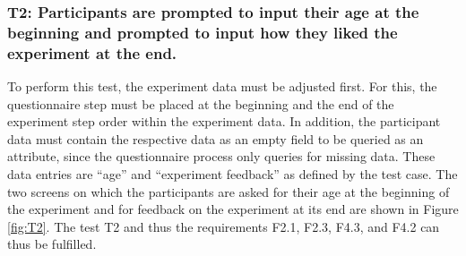 \newpage



\subsubsection*{T2: Participants are prompted to input their age at the beginning and prompted to input how they liked the experiment at the end.}

To perform this test, the experiment data must be adjusted first. For this, the questionnaire step must be placed at the beginning and the end of the experiment step order within the experiment data. In addition, the participant data must contain the respective data as an empty field to be queried as an attribute, since the questionnaire process only queries for missing data. These data entries are \enquote{age} and \enquote{experiment feedback} as defined by the test case. The two screens on which the participants are asked for their age at the beginning of the experiment and for feedback on the experiment at its end are shown in Figure \ref{fig:T2}. The test T2 and thus the requirements F2.1, F2.3, F4.3, and F4.2 can thus be fulfilled.


